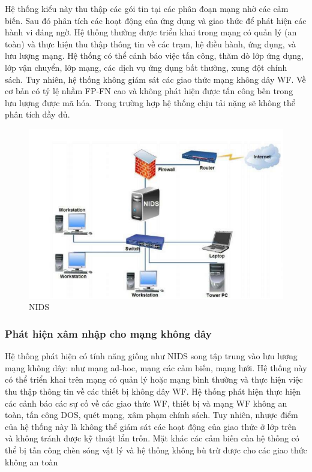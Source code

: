 Hệ thống kiểu này thu thập các gói tin tại các phân đoạn mạng nhờ các cảm biến. Sau đó phân tích các hoạt động của ứng dụng và giao thức để phát hiện các hành vi đáng ngờ. Hệ thống thường được triển khai trong mạng có quản lý (an toàn) và thực hiện thu thập thông tin về các trạm, hệ điều hành, ứng dụng, và lưu lượng mạng. Hệ thống có thể cảnh báo việc tấn công, thăm dò lớp ứng dụng, lớp vận chuyển, lớp mạng, các dịch vụ ứng dụng bất thường, xung đột chính sách. Tuy nhiên, hệ thống không giám sát các giao thức mạng không dây WF. Về cơ bản có tỷ lệ nhầm FP-FN cao và không phát hiện được tấn công bên trong lưu lượng được mã hóa. Trong trường hợp hệ thống chịu tải nặng sẽ không thể phân tích đầy đủ.
\begin{figure}[H]
    \centering
    \includegraphics[scale = 0.6]{Chapter1/Figs/NIDS.png}
    \caption{NIDS}
     
\end{figure}

\subsubsection*{Phát hiện xâm nhập cho mạng không dây}
Hệ thống phát hiện có tính năng giống như NIDS song tập trung vào lưu lượng mạng không dây: như mạng ad-hoc, mạng các cảm biến, mạng lưới. Hệ thống này có thể triển khai trên mạng có quản lý hoặc mạng bình thường và thực hiện việc thu thập thông tin về các thiết bị không dây WF. Hệ thống phát hiện thực hiện các cảnh báo các sự cố về các giao thức WF, thiết bị và mạng WF không an toàn, tấn công DOS, quét mạng, xâm phạm chính sách. Tuy nhiên, nhược điểm của hệ thống này là không thể giám sát các hoạt động của giao thức ở lớp trên và không tránh được kỹ thuật lẩn trốn. Mặt khác các cảm biến của hệ thống có thể bị tấn công chèn sóng vật lý và hệ thống không bù trừ được cho các giao thức không an toàn


